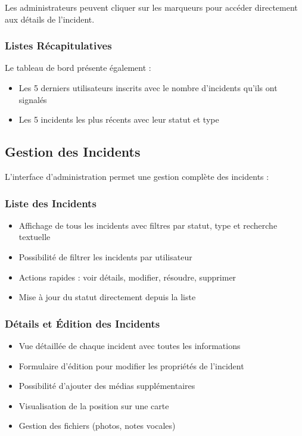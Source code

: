 \documentclass[12pt,a4paper]{article}
\begin{document}
Les administrateurs peuvent cliquer sur les marqueurs pour accéder directement aux détails de l'incident.

\subsubsection{Listes Récapitulatives}

Le tableau de bord présente également :
\begin{itemize}
    \item Les 5 derniers utilisateurs inscrits avec le nombre d'incidents qu'ils ont signalés
    \item Les 5 incidents les plus récents avec leur statut et type
\end{itemize}

\subsection{Gestion des Incidents}

L'interface d'administration permet une gestion complète des incidents :

\subsubsection{Liste des Incidents}
\begin{itemize}
    \item Affichage de tous les incidents avec filtres par statut, type et recherche textuelle
    \item Possibilité de filtrer les incidents par utilisateur
    \item Actions rapides : voir détails, modifier, résoudre, supprimer
    \item Mise à jour du statut directement depuis la liste
\end{itemize}

\subsubsection{Détails et Édition des Incidents}
\begin{itemize}
    \item Vue détaillée de chaque incident avec toutes les informations
    \item Formulaire d'édition pour modifier les propriétés de l'incident
    \item Possibilité d'ajouter des médias supplémentaires
    \item Visualisation de la position sur une carte
    \item Gestion des fichiers (photos, notes vocales)
\end{itemize}
\end{document}
